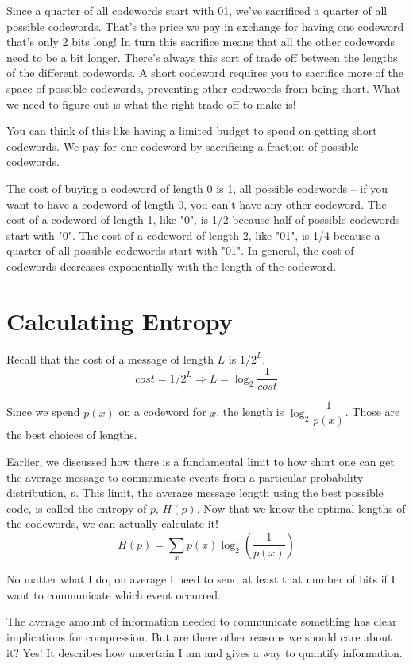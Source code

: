 Since a quarter of all codewords start with 01, we've sacrificed a quarter of all possible codewords.
That's the price we pay in exchange for having one codeword that's only 2 bits long!
In turn this sacrifice means that all the other codewords need to be a bit longer.
There's always this sort of trade off between the lengths of the different codewords.
A short codeword requires you to sacrifice more of the space of possible codewords, preventing other codewords from being short.
What we need to figure out is what the right trade off to make is!

You can think of this like having a limited budget to spend on getting short codewords.
We pay for one codeword by sacrificing a fraction of possible codewords.

The cost of buying a codeword of length 0 is 1, all possible codewords – if you want to have a codeword of length 0, you can't have any other codeword.
The cost of a codeword of length 1, like "0", is 1/2 because half of possible codewords start with "0".
The cost of a codeword of length 2, like "01", is 1/4 because a quarter of all possible codewords start with "01".
In general, the cost of codewords decreases exponentially with the length of the codeword.

\section{Calculating Entropy}
Recall that the cost of a message of length $L$ is $1/2^L$.
$$cost = 1/2^L \Rightarrow L = \log_2{\dfrac{1}{cost}}$$

Since we spend $p(x)$ on a codeword for $x$, the length is $\log_2{\dfrac{1}{p(x)}}$. Those are the best choices of lengths.

Earlier, we discussed how there is a fundamental limit to how short one can get the average message to communicate events
from a particular probability distribution, $p$.
This limit, the average message length using the best possible code, is called the entropy of $p$, $H(p)$.
Now that we know the optimal lengths of the codewords, we can actually calculate it!
$$H(p) = \sum_x p(x)\log_2\left(\frac{1}{p(x)}\right)$$

No matter what I do, on average I need to send at least that number of bits if I want to communicate which event occurred.

The average amount of information needed to communicate something has clear implications for compression.
But are there other reasons we should care about it? Yes! It describes how uncertain I am and gives a way to quantify information.

